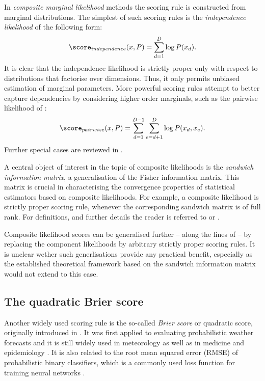 In \emph{composite marginal likelihood} methods the scoring rule is constructed from marginal distributions. The simplest of such scoring rules is the \emph{independence likelihood} \citep{Chandler07} of the following form:
%
\begin{equation}
	\score_{independence}(x,P) = \sum_{d=1}^{D} \log P(x_d).
\end{equation}
%
It is clear that the independence likelihood is strictly proper only with respect to distributions that factorise over dimensions. Thus, it only permits unbiased estimation of marginal parameters. More powerful scoring rules attempt to better capture dependencies by considering higher order marginals, such as the pairwise likelihood of \citet{Cox04}:
%
\begin{equation}
	\score_{pairwise}(x,P) = \sum_{d=1}^{D-1} \sum_{e=d+1}^{D} \log P(x_d,x_e).
\end{equation}
%
Further special cases are reviewed in \citep{Varin11}.

A central object of interest in the topic of composite likelihoods is the \emph{sandwich information matrix}, a generalisation of the Fisher information matrix. This matrix is crucial in characterising the convergence properties of statistical estimators based on composite likelihoods. For example, a composite likelihood is strictly proper scoring rule, whenever the corresponding sandwich matrix is of full rank. For definitions, and further details the reader is referred to \citep{Lindsay88} or \citep{Varin11}.

Composite likelihood scores can be generalised further -- along the lines of \citep{Dawid2012} -- by replacing the component likelihoods by arbitrary strictly proper scoring rules. It is unclear wether such generlisations provide any practical benefit, especially as the established theoretical framework based on the sandwich information matrix would not extend to this case.

\cbend

\subsection{The quadratic Brier score\label{sec:Brier_score}}

Another widely used scoring rule is the so-called \emph{Brier score} or quadratic score, originally introduced in \citep{Brier1950}. It was first applied to evaluating probabilistic weather forecasts and it is still widely used in meteorology \citep{Ferro2007} as well as in medicine \citep{Spiegelhalter2006} and epidemiology \citep{Redelmeier1991}. It is also related to the root mean squared error (RMSE) of probabilistic binary classifiers, which is a commonly used loss function for training neural networks \citep{Rumelhart1988}.

